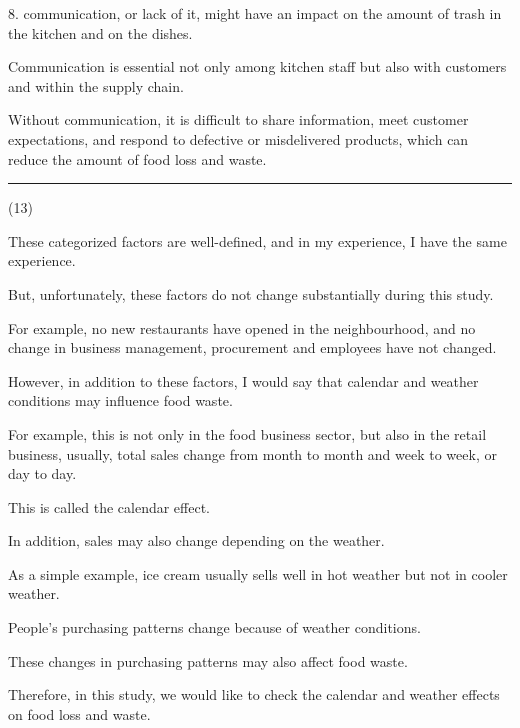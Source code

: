 \documentclass{article}
\begin{document}
\begin{multicols}{2}
\begin{spacing}{1.1}
8. communication, or lack of it, might have an impact on the amount of trash in the kitchen and on the dishes.

Communication is essential not only among kitchen staff but also with customers and within the supply chain.

Without communication, 
it is difficult to share information, meet customer expectations, and respond to defective or misdelivered products, which can reduce the amount of food loss and waste.


\noindent\rule{0.1\textwidth}{1pt}\small(13)

These categorized factors are well-defined, 
and in my experience, I have the same experience.

But, unfortunately, these factors do not change substantially during this study.

For example, 
no new restaurants have opened in the neighbourhood, 
and no change in business management, procurement and employees have not changed.

\vspace{1em}

However, in addition to these factors, 
I would say that calendar and weather conditions may influence food waste.

For example, 
this is not only in the food business sector, 
but also in the retail business, 
usually, total sales change from month to month and week to week, or day to day. 

This is called the calendar effect.

\vspace{1em}

In addition, 
sales may also change depending on the weather.

As a simple example, 
ice cream usually sells well in hot weather but not in cooler weather.

People's purchasing patterns change because of weather conditions. 

These changes in purchasing patterns may also affect food waste.

\vspace{1em}

Therefore, in this study, we would like to check the calendar and weather effects on food loss and waste.


\end{spacing}
\end{multicols}
\end{document}
